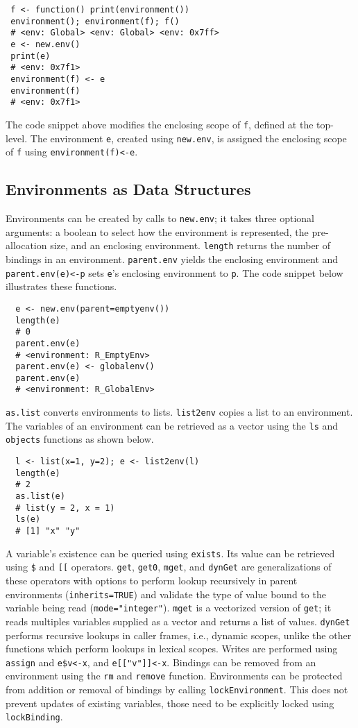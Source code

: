 \documentclass[10pt,sigplan,authorversion=true]{acmart}
\renewcommand{\c}[1]{\lstinline |#1|\xspace}
\newcommand{\newEnv}{\c{new.env}}
\newcommand{\asList}{\c{as.list}}
\newcommand{\listToEnv}{\c{list2env}}
\newcommand{\ls}{\c{ls}}
\newcommand{\objects}{\c{objects}}
\newcommand{\subDollar}{\c{$}}
\newcommand{\subBracket}{\c{[[}}
\newcommand{\exist}{\c{exists}}
\newcommand{\get}{\c{get}}
\newcommand{\getZero}{\c{get0}}
\newcommand{\mget}{\c{mget}}
\newcommand{\dynGet}{\c{dynGet}}
\newcommand{\assign}{\c{assign}}
\newcommand{\remove}{\c{remove}}
\renewcommand{\rm}{\c{rm}}
\newcommand{\lockEnvironment}{\c{lockEnvironment}}
\newcommand{\lockBinding}{\c{lockBinding}}
\newcommand{\parentEnv}{\c{parent.env}}
\begin{document}
\begin{lstlisting}
 f <- function() print(environment())
 environment(); environment(f); f()
 # <env: Global> <env: Global> <env: 0x7ff>
 e <- new.env()
 print(e)
 # <env: 0x7f1>
 environment(f) <- e
 environment(f)
 # <env: 0x7f1>
\end{lstlisting}

The code snippet above modifies the enclosing scope of \c{f}, defined at the
top-level. The environment \c{e}, created using \c{new.env}, is assigned the
enclosing scope of \c{f} using \c{environment(f)<-e}.

\subsection{Environments as Data Structures}

Environments can be created by calls to \newEnv; it takes three optional
arguments: a boolean to select how the environment is represented, the
pre-allocation size, and an enclosing environment. \c{length} returns the number
of bindings in an environment. \parentEnv yields the enclosing environment and
\c{parent.env(e)<-p} sets {\small\tt e}'s enclosing environment to \c{p}. The
code snippet below illustrates these functions.

\begin{lstlisting}
  e <- new.env(parent=emptyenv())
  length(e)
  # 0
  parent.env(e)
  # <environment: R_EmptyEnv>
  parent.env(e) <- globalenv()
  parent.env(e)
  # <environment: R_GlobalEnv>
\end{lstlisting}

\noindent
\asList converts environments to lists. \listToEnv copies a list to an
environment. The variables of an environment can be retrieved as a vector using
the \ls and \objects functions as shown below.

\begin{lstlisting}
  l <- list(x=1, y=2); e <- list2env(l)
  length(e)
  # 2
  as.list(e)
  # list(y = 2, x = 1)
  ls(e)
  # [1] "x" "y"
\end{lstlisting}

\noindent
A variable's existence can be queried using \exist. Its value can be retrieved
using \subDollar and \subBracket operators. \get, \getZero, \mget, and \dynGet
are generalizations of these operators with options to perform lookup
recursively in parent environments (\c{inherits=TRUE}) and validate the type of
value bound to the variable being read (\c{mode="integer"}). \mget is a
vectorized version of \get; it reads multiples variables supplied as a vector
and returns a list of values. \dynGet performs recursive lookups in caller
frames, i.e., dynamic scopes, unlike the other functions which perform lookups
in lexical scopes. Writes are performed using \assign and \c{e$v<-x}, and
\c{e[["v"]]<-x}. Bindings can be removed from an environment using the \rm and
\remove function.
Environments can be protected from addition or removal of bindings by calling
\lockEnvironment. This does not prevent updates of existing variables, those
need to be explicitly locked using \lockBinding.
\end{document}
